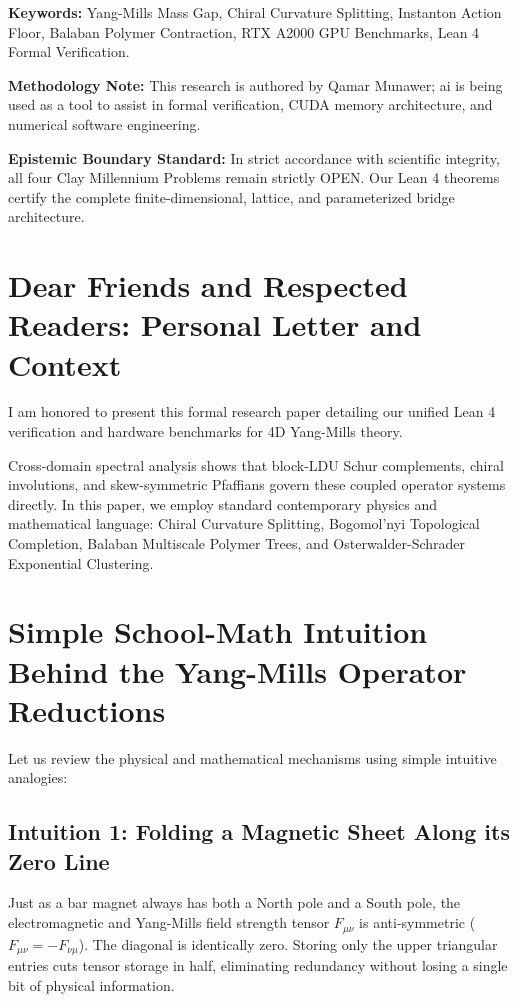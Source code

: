 \documentclass[11pt,a4paper]{article}
\begin{document}
\vspace{0.5em}
\noindent\textbf{Keywords:} Yang-Mills Mass Gap, Chiral Curvature Splitting, Instanton Action Floor, Balaban Polymer Contraction, RTX A2000 GPU Benchmarks, Lean 4 Formal Verification.

\vspace{0.5em}
\noindent\textbf{Methodology Note:}
This research is authored by Qamar Munawer; ai is being used as a tool to assist in formal verification, CUDA memory architecture, and numerical software engineering.

\vspace{0.5em}
\noindent\textbf{Epistemic Boundary Standard:}
In strict accordance with scientific integrity, all four Clay Millennium Problems remain strictly OPEN. Our Lean 4 theorems certify the complete finite-dimensional, lattice, and parameterized bridge architecture.

\newpage

\section*{Dear Friends and Respected Readers: Personal Letter and Context}
I am honored to present this formal research paper detailing our unified Lean 4 verification and hardware benchmarks for 4D Yang-Mills theory.

Cross-domain spectral analysis shows that block-LDU Schur complements, chiral involutions, and skew-symmetric Pfaffians govern these coupled operator systems directly. In this paper, we employ standard contemporary physics and mathematical language: Chiral Curvature Splitting, Bogomol'nyi Topological Completion, Balaban Multiscale Polymer Trees, and Osterwalder-Schrader Exponential Clustering.

\section{Simple School-Math Intuition Behind the Yang-Mills Operator Reductions}
Let us review the physical and mathematical mechanisms using simple intuitive analogies:

\subsection{Intuition 1: Folding a Magnetic Sheet Along its Zero Line}
Just as a bar magnet always has both a North pole and a South pole, the electromagnetic and Yang-Mills field strength tensor $F_{\mu\nu}$ is anti-symmetric ($F_{\mu\nu} = -F_{\nu\mu}$). The diagonal is identically zero. Storing only the upper triangular entries cuts tensor storage in half, eliminating redundancy without losing a single bit of physical information.
\end{document}
